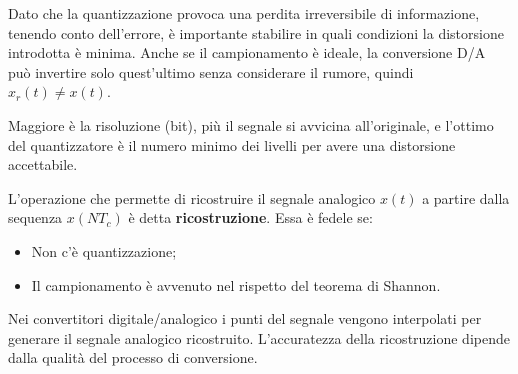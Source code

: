 Dato che la quantizzazione provoca una perdita irreversibile di informazione, tenendo conto dell'errore, è importante stabilire in quali condizioni la distorsione introdotta è minima. Anche se il campionamento è ideale, la conversione D/A può invertire solo quest'ultimo senza considerare il rumore, quindi $x_r(t) \neq x(t)$.

Maggiore è la risoluzione (bit), più il segnale si avvicina all'originale, e l'ottimo del quantizzatore è il numero minimo dei livelli per avere una distorsione accettabile.

L'operazione che permette di ricostruire il segnale analogico $x(t)$ a partire dalla sequenza $x(NT_c)$ è detta \textbf{ricostruzione}. Essa è fedele se:
\begin{itemize}
	\item Non c'è quantizzazione;
	\item Il campionamento è avvenuto nel rispetto del teorema di Shannon.
\end{itemize}
Nei convertitori digitale/analogico i punti del segnale vengono interpolati per generare il segnale analogico ricostruito. L'accuratezza della ricostruzione dipende dalla qualità del processo di conversione.
